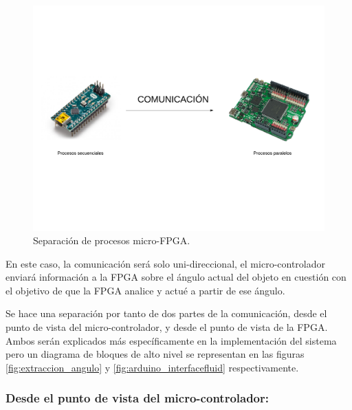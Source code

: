 \begin{figure}[H]
	\center
	\includegraphics[trim = 0mm 40mm 0mm 20mm, clip,scale=0.4]{imagenes/Balancing_robot/coexistencia1.pdf}
	\caption{Separación de procesos micro-FPGA.}
	\label{fig:coexistencia1}
\end{figure}

En este caso, la comunicación será solo uni-direccional, el micro-controlador enviará información a la FPGA sobre el ángulo actual del objeto en cuestión con el objetivo de que la FPGA analice y actué a partir de ese ángulo.\newline

Se hace una separación por tanto de dos partes de la comunicación, desde el punto de vista del micro-controlador, y desde el punto de vista de la FPGA. Ambos serán explicados más específicamente en la implementación del sistema pero un diagrama de bloques de alto nivel se representan en las figuras \ref{fig:extraccion_angulo} y \ref{fig:arduino_interfacefluid} respectivamente. 

\subsubsection{Desde el punto de vista del micro-controlador:}

